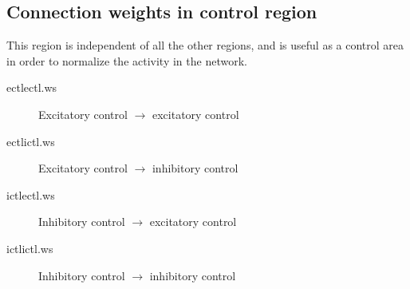 \documentclass[12pt]{article}
\begin{document}
\subsection{Connection weights in control region}
This region is independent of all the other regions, and is useful as
a control area in order to normalize the activity in the network. 
\begin{description}
  \item[ectlectl.ws] Excitatory control $\rightarrow$
                     excitatory control
  \item[ectlictl.ws] Excitatory control $\rightarrow$
                     inhibitory control
  \item[ictlectl.ws] Inhibitory control $\rightarrow$
                     excitatory control
  \item[ictlictl.ws] Inhibitory control $\rightarrow$
                     inhibitory control
\end{description}

\end{document}
